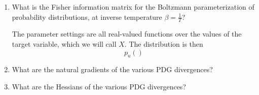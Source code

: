 \documentclass{article}
\newcommand\quest[1]{\textsf{\large\color{blue} #1}\par}
\begin{document}
\begin{enumerate}[label={\textsf{\large\color{blue}\arabic*.}}]
    \item \quest{
        What is the Fisher information matrix for the Boltzmann parameterization of
            probability distributions, at inverse temperature $\beta = \frac1T$?
    }
    
    The parameter settings are all real-valued functions over the values of the target variable, which we will call $X$. The distribution is then 
    \[
        p_u( )
    \]
    
    \item \quest{What are the natural gradients of the various PDG divergences?}
    \item \quest{What are the Hessians of the various PDG divergences?}
    
\end{enumerate}
\end{document}
